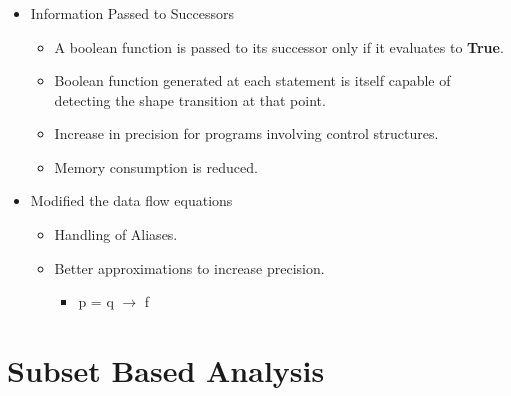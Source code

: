 \documentclass[mathserif,10pt]{beamer}
\newcommand{\true}{\textbf{True}}
\begin{document}
\frame
{
  \frametitle{\subsecname}
  \begin{itemize}
   \item Information Passed to Successors
      \begin{itemize}
       \item A boolean function is passed to its successor only if it evaluates to \true. 	
       \item Boolean function generated at each statement is itself capable of detecting the shape transition at that point. 
       \item Increase in precision for programs involving control structures.
       \item Memory consumption is reduced.
      \end{itemize}
  \item Modified the data flow equations
  \begin{itemize}
  \item Handling of Aliases.       
  \item	 Better approximations to increase precision.
	\begin{itemize}
	 \item p = q $\rightarrow$ f 
	\end{itemize}
  \end{itemize}
  \end{itemize}
}

\section{Subset Based Analysis}
\end{document}
